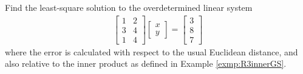 \begin{exmp}
Find the least-square solution to the overdetermined linear system
\begin{align*}
\begin{bmatrix}
1 & 2 \\
3 & 4 \\
1 & 4
\end{bmatrix}
\begin{bmatrix}
x \\
y
\end{bmatrix}
=
\begin{bmatrix}
3 \\
8 \\
7
\end{bmatrix}
\end{align*}
where the error is calculated with respect to the usual Euclidean distance, and also relative to the inner product as defined in Example \ref{exmp:R3innerGS}.
\end{exmp}
